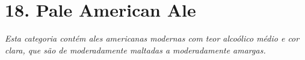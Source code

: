\section*{18. Pale American Ale}
\textit{Esta categoria contém ales americanas modernas com teor alcoólico médio e cor clara, que são de moderadamente maltadas a moderadamente amargas.}

